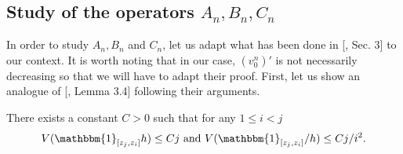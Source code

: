 \documentclass{ws-sd}
\newcommand{\indic}{\mathbbm{1}}
\begin{document}
\subsection{Study of the operators \texorpdfstring{$A_n, B_n, C_n$}{}}
In order to study $A_n, B_n$ and $C_n$, let us adapt what has been done in [, Sec. 3] to our context. It is worth noting that in our case, $(v_0^n)'$ is not necessarily decreasing so that we will have to adapt their proof. First, let us show an analogue of [, Lemma 3.4] following their arguments.
\begin{lemma}
    There exists a constant $C>0$ such that for any $1 \le i < j$
    \begin{align*}
        V(\indic_{[z_j,z_i]}h) \le Cj \text{ and }  V(\indic_{[z_j,z_i]}/h) \le Cj/i^2.
    \end{align*}
\end{lemma}
\end{document}
